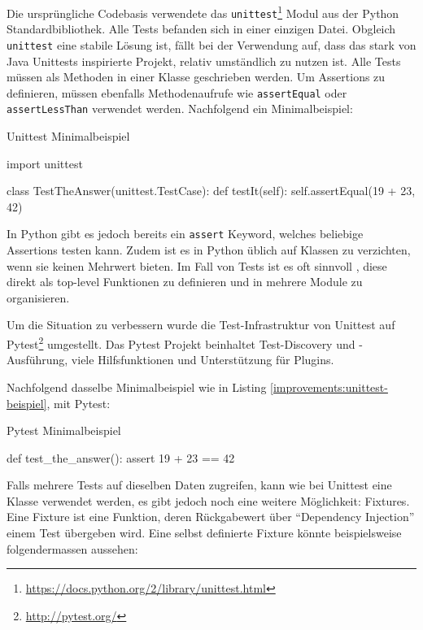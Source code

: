Die ursprüngliche Codebasis verwendete das
\texttt{unittest}\footnote{\url{https://docs.python.org/2/library/unittest.html}}
Modul aus der Python Standardbibliothek. Alle Tests befanden sich in einer
einzigen Datei.  Obgleich \texttt{unittest} eine stabile Lösung ist, fällt bei
der Verwendung auf, dass das stark von Java Unittests inspirierte Projekt,
relativ umständlich zu nutzen ist. Alle Tests müssen als Methoden in einer
Klasse geschrieben werden. Um Assertions zu definieren, müssen ebenfalls
Methodenaufrufe wie \texttt{assertEqual} oder \texttt{assertLessThan} verwendet
werden. Nachfolgend ein Minimalbeispiel:

\begin{listing}[H]
\caption{Unittest Minimalbeispiel}
\label{improvements:unittest-beispiel}
\begin{pythoncode}
import unittest

class TestTheAnswer(unittest.TestCase):
    def testIt(self):
        self.assertEqual(19 + 23, 42)
\end{pythoncode}
\end{listing}

In Python gibt es jedoch bereits ein \texttt{assert} Keyword, welches beliebige
Assertions testen kann. Zudem ist es in Python üblich auf Klassen zu
verzichten, wenn sie keinen Mehrwert bieten. Im Fall von Tests ist es oft
sinnvoll , diese direkt als top-level Funktionen zu definieren und in mehrere
Module zu organisieren.

Um die Situation zu verbessern wurde die Test-Infrastruktur von
Unittest auf Pytest\footnote{\url{http://pytest.org/}} umgestellt. Das
Pytest Projekt beinhaltet Test-Discovery und -Ausführung, viele Hilfsfunktionen
und Unterstützung für Plugins.

Nachfolgend dasselbe Minimalbeispiel wie in Listing
\ref{improvements:unittest-beispiel}, mit Pytest:

\begin{listing}[H]
\caption{Pytest Minimalbeispiel}
\label{improvements:pytest-beispiel}
\begin{pythoncode}
def test_the_answer():
    assert 19 + 23 == 42
\end{pythoncode}
\end{listing}

Falls mehrere Tests auf dieselben Daten zugreifen, kann wie bei Unittest eine
Klasse verwendet werden, es gibt jedoch noch eine weitere Möglichkeit: Fixtures.
Eine Fixture ist eine Funktion, deren Rückgabewert über \enquote{Dependency
Injection} einem Test übergeben wird. Eine selbst definierte Fixture könnte
beispielsweise folgendermassen aussehen:

